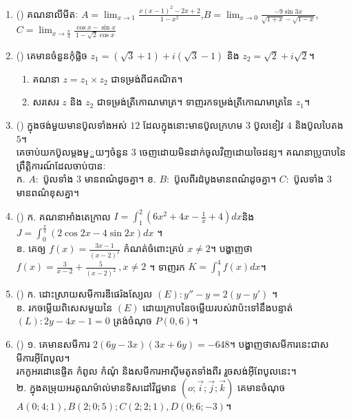 \documentclass{officialexam}
\begin{document}
\begin{enumerate}[m]
	\item {\color{khtug}()} គណនាលីមីតៈ $A=\lim_{x\to1}\frac{x\left(x-1\right)^2-2x+2}{1-x^2}$,\quad $B=\lim_{x\to0}\frac{-9\sin3x}{\sqrt{1+x}-\sqrt{1-x}}$,\quad $C=\lim_{x\to\frac{\pi}{4}}\frac{\cos x-\sin x}{1-\sqrt{2}\cos x}$
	\item {\color{khtug}()} គេមានចំនួនកុំផ្លិច $z_1=\left(\sqrt{3}+1\right)+i\left(\sqrt{3}-1\right)$ និង $z_2=\sqrt{2}+i\sqrt{2}$។
	\begin{enumerate}[k]
		\item គណនា $z=z_1\times z_2$ ជាទម្រង់ពីជគណិត។
		\item សរសេរ $z$ និង $z_2$ ជាទម្រង់ត្រីកោណមាត្រ។ ទាញរកទម្រង់ត្រីកោណមាត្រនៃ $z_1$។
	\end{enumerate}
	\item {\color{khtug}()} ក្នុងថង់មួយមានប៊ូលទាំងអស់ $12$ ដែលក្នុងនោះមានប៊ូលក្រហម $3$ ប៊ូលខៀវ $4$ និងប៊ូលបៃតង $5$។ \\គេចាប់យកប៊ូលម្តងមួួយៗចំនួន $3$ ចេញដោយមិនដាក់ចូលវិញដោយចៃដន្យ។ គណនាប្រូបាបនៃព្រឹត្តិការណ៍ដែលចាប់បានៈ\\
	{\color{khtug}ក.} $A:$ ប៊ូលទាំង $3$ មានពណ៌ដូចគ្នា។\quad
	{\color{khtug}ខ.} $B:$ ប៊ូលពីរដំបូង​មានពណ៌ដូចគ្នា។ $C:$ ប៊ូលទាំង $3$ មានពណ៌ខុសគ្នា។
	\item {\color{khtug}()} {\color{khtug}ក.} គណនាអាំងតេក្រាល $I=\int_{1}^{2}\left(6x^2+4x-\frac{1}{x}+4\right)dx$\quad និង $J=\int_{0}^{\frac{\pi}{4}}\left(2\cos2x-4\sin2x\right)dx$ ។\\
	 {\color{khtug}ខ.} គេឲ្យ $f(x)=\frac{3x-1}{\left(x-2\right)^2}$ កំណត់ចំពោះគ្រប់ $x\ne 2$។ បង្ហាញថា $f(x)=\frac{3}{x-2}+\frac{5}{\left(x-2\right)^2}~,x\ne2$ ។ ទាញរក $K=\int_{1}^{4}f(x)dx$។
	\item {\color{khtug}()} {\color{khtug}ក.} ដោះស្រាយសមីការឌីផេរ៉ងស្យែល $\left(E\right):y''-y=2\left(y-y'\right)$ ។\\
	{\color{khtug}ខ.} រកចម្លើយពិសេសមួយនៃ $\left(E\right)$ ដោយក្រាបនៃចម្លើយរបស់វាប៉ះទៅនឹងបន្ទាត់ $\left(L\right):2y-4x-1=0$ ត្រង់ចំណុច $P\left(0,6\right)$។ 
	\item {\color{khtug}()} {\color{khtug}១.} គេមានសមីការ $2\left(6y-3x\right)\left(3x+6y\right)=-648$។ បង្ហាញថាសមីការនេះជាសមីការអុីពែបូល។ \\រកកូអរដោនេផ្ចិត កំពូល កំណុំ និងសមីការអាសុីមតូតទាំងពីរ រួចសង់អុីពែបូលនេះ។\\
	{\color{khtug}២.} ក្នុងតម្រុយអរតូណម៉ាល់មានទិសដៅវិជ្ជមាន $\left(o;\vec{i};\vec{j};\vec{k}\right)$ គេមានចំណុច $A\left(0;4;1\right),B\left(2;0;5\right);C\left(2;2;1\right),D\left(0;6;-3\right)$។

\end{enumerate}
\end{document}
